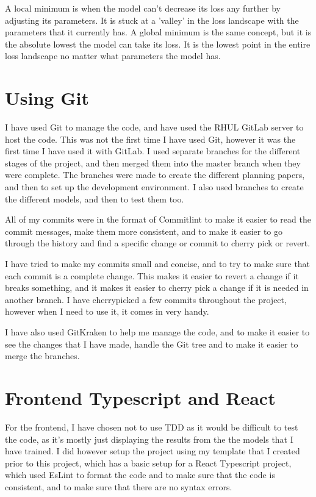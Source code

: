 \documentclass[]{final_report}
\begin{document}
A local minimum is when the model can't decrease its loss any further by adjusting its parameters.
It is stuck at a 'valley' in the loss landscape with the parameters that it currently has.
A global minimum is the same concept, but it is the absolute lowest the model can take its loss.
It is the lowest point in the entire loss landscape no matter what parameters the model has.


\section{Using Git}
I have used Git to manage the code, and have used the RHUL GitLab server to host the code.
This was not the first time I have used Git, however it was the first time I have used it with GitLab.
I used separate branches for the different stages of the project, and then merged them into the master branch when they were complete.
The branches were made to create the different planning papers, and then to set up the development environment.
I also used branches to create the different models, and then to test them too.

All of my commits were in the format of Commitlint\cite{CommitLint} to make it easier to read the commit messages, make them more consistent,
and to make it easier to go through the history and find a specific change or commit to cherry pick or revert.

I have tried to make my commits small and concise, and to try to make sure that each commit is a complete change.
This makes it easier to revert a change if it breaks something, and it makes it easier to cherry pick a change if it is needed in another branch. I have cherrypicked a few commits throughout the project, however when I need to use it, it comes in very handy.

I have also used GitKraken\cite{GitKraken} to help me manage the code, and to make it easier to see the changes that I have made, handle the Git tree and to make it easier to merge the branches.

\section{Frontend Typescript and React}

For the frontend, I have chosen not to use TDD as it would be difficult to test the code, as it's mostly just displaying the results from the the models that I have trained. I did however setup the project using my template\cite{TypescriptProjectTemplate} that I created prior to this project, which has a basic setup for a React Typescript project, which used EsLint\cite{EsLint} to format the code and to make sure that the code is consistent, and to make sure that there are no syntax errors.
\end{document}
